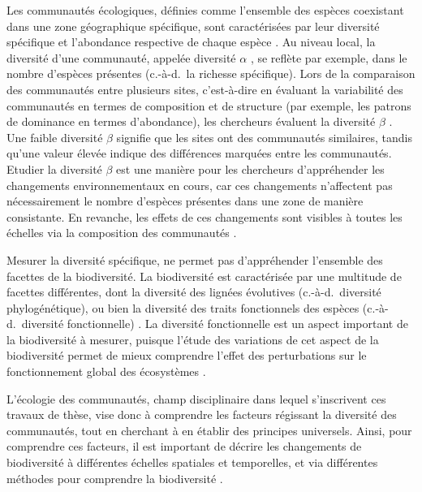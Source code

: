 \begin{refsection}
Les communautés écologiques, définies comme l'ensemble des espèces
coexistant dans une zone géographique spécifique, sont caractérisées par
leur diversité spécifique et l'abondance respective de chaque espèce
\autocite{Vellend_2010}. Au niveau local, la diversité d'une communauté,
appelée diversité \(\alpha\) \autocite{Whittaker_1960}, se reflète par
exemple, dans le nombre d'espèces présentes (c.-à-d.~la richesse
spécifique). Lors de la comparaison des communautés entre plusieurs
sites, c'est-à-dire en évaluant la variabilité des communautés en termes
de composition et de structure (par exemple, les patrons de dominance en
termes d'abondance), les chercheurs évaluent la diversité \(\beta\)
\autocite{Whittaker_1972}. Une faible diversité \(\beta\) signifie que
les sites ont des communautés similaires, tandis qu'une valeur élevée
indique des différences marquées entre les communautés. Etudier la
diversité \(\beta\) est une manière pour les chercheurs d'appréhender
les changements environnementaux en cours, car ces changements
n'affectent pas nécessairement le nombre d'espèces présentes dans une
zone de manière consistante. En revanche, les effets de ces changements
sont visibles à toutes les échelles via la composition des communautés
\autocite{Dornelas_2023}.

Mesurer la diversité spécifique, ne permet pas d'appréhender l'ensemble
des facettes de la biodiversité. La biodiversité est caractérisée par
une multitude de facettes différentes, dont la diversité des lignées
évolutives (c.-à-d.~diversité phylogénétique), ou bien la diversité des
traits fonctionnels des espèces (c.-à-d.~diversité fonctionnelle)
\autocite{Bagousse-Pinguet_2019}. La diversité fonctionnelle est un
aspect important de la biodiversité à mesurer, puisque l'étude des
variations de cet aspect de la biodiversité permet de mieux comprendre
l'effet des perturbations sur le fonctionnement global des écosystèmes
\autocite{Mouillot_2013}.

L'écologie des communautés, champ disciplinaire dans lequel s'inscrivent
ces travaux de thèse, vise donc à comprendre les facteurs régissant la
diversité des communautés, tout en cherchant à en établir des principes
universels. Ainsi, pour comprendre ces facteurs, il est important de
décrire les changements de biodiversité à différentes échelles spatiales
et temporelles, et via différentes méthodes pour comprendre la
biodiversité \autocite{Dornelas_2023}.

\hypertarget{la-niche-uxe9cologique-un-cadre-explicatif-de-la-diversituxe9-des-communautuxe9s}{%
}
\end{refsection}
